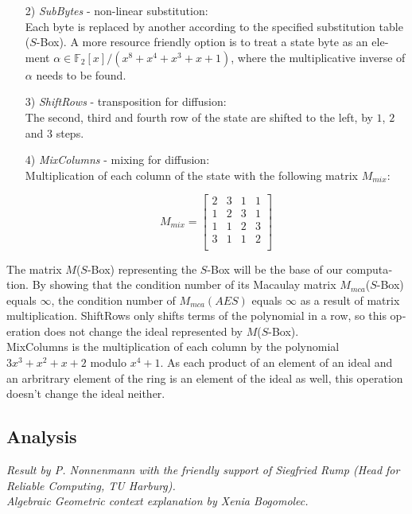 \documentclass[a4paper,11pt]{article}
\begin{document}
\begin{otherlanguage}{english}
\begin{itemize} [noitemsep, nolistsep]
  \item[2)] \textit{SubBytes} - non-linear substitution: \\
  Each byte is replaced by another according to the specified substitution table ($S$-Box). A more resource friendly option is to treat a state byte as an element $\alpha \in \mathbb{F}_2 [x]/(x^8 + x^4 + x^3 + x + 1)$, where the multiplicative inverse of $\alpha$ needs to be found.
  \vspace{0.1cm}

  \item[3)] \textit{ShiftRows} - transposition for diffusion: \\
  The second, third and fourth row of the state are shifted to the left, by $1$, $2$ and $3$ steps.
  \vspace{0.1cm}

  \item[4)] \textit{MixColumns} - mixing for diffusion: \\
  Multiplication of each column of the state with the following matrix $M_{mix}$:

  $$ 
  	M_{mix} = 
  	\begin{bmatrix}
  		2 & 3 & 1 & 1 \\ 
  	 	1 & 2 & 3 & 1 \\
  	 	1 & 1 & 2 & 3 \\
  	 	3 & 1 & 1 & 2 \\
  	\end{bmatrix}
  $$

\end{itemize} 

\vspace{0.3cm}
\noindent
The matrix $M$($S$-Box) representing the $S$-Box will be the base of our computation. By showing that the condition number of its Macaulay matrix $M_{mca}$($S$-Box) equals $\infty$, the condition number of $M_{mca}(AES)$ equals $\infty$ as a result of matrix multiplication. ShiftRows only shifts terms of the polynomial in a row, so this operation does not change the ideal represented by $M$($S$-Box). \\

\noindent
MixColumns is the multiplication of each column by the polynomial $3x^{3}+x^{2}+x+2$ modulo $x^4+1$. As each product of an element of an ideal and an arbritrary element of the ring is an element of the ideal as well, this operation doesn't change the ideal neither.\\


\subsection{Analysis}
\noindent 
{\small \textit{Result by P. Nonnenmann with the friendly support of Siegfried Rump (Head for Reliable Computing, TU Harburg). \\
Algebraic Geometric context explanation by Xenia Bogomolec.}}\\


\end{otherlanguage}
\end{document}
